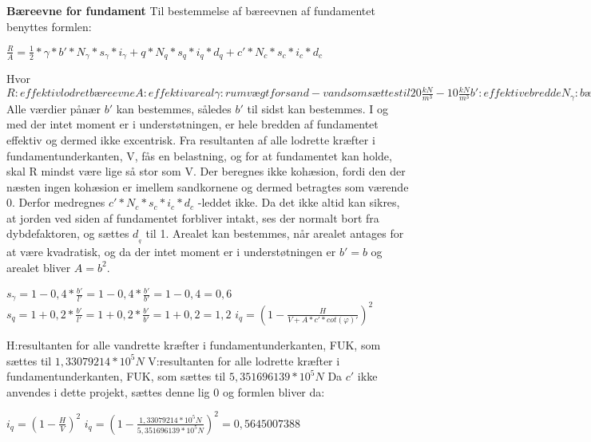 
\textbf{Bæreevne for fundament}
\newline
Til bestemmelse af bæreevnen af fundamentet benyttes formlen:
\begin{center}
	$\frac{R}{A}=\frac{1}{2}*\gamma*b'*N_\gamma*s_\gamma*i_\gamma+q*N_q*s_q*i_q*d_q+c'*N_c*s_c*i_c*d_c$
\end{center}

\newline
Hvor 
$R:effektiv lodret bæreevne
A:effektiv areal 
\gamma:rumvægt for sand - vand som sættes til 20\frac{kN}{m^3}-10\frac{kN}{m^3}
b':effektive bredde
N_\gamma:bæreevnefaktor 
s_\gamma og s_q:formfaktor
i_\gamma og i_q:hældningsfaktor
q:effektiv lodret overlejringstryk ved FUK 
d_q:dybdefaktor$
\newline
Alle værdier pånær $b'$ kan bestemmes, således $b'$ til sidst kan bestemmes.
I og med der intet moment er i understøtningen, er hele bredden af fundamentet effektiv og dermed ikke excentrisk. Fra resultanten af alle lodrette kræfter i fundamentunderkanten, V, fås en belastning, og for at fundamentet kan holde, skal R mindst være lige så stor som V.
Der beregnes ikke kohæsion, fordi den der næsten ingen kohæsion er imellem sandkornene og dermed betragtes som værende 0. Derfor medregnes $c'*N_c*s_c*i_c*d_c$ -leddet ikke.
Da det ikke altid kan sikres, at jorden ved siden af fundamentet forbliver intakt, ses der normalt bort fra dybdefaktoren, og sættes $d__q$ til 1.
Arealet kan bestemmes, når arealet antages for at være kvadratisk, og da der intet moment er i understøtningen er $b'=b$ og arealet bliver $A=b^2$.
\newline
\begin{center}
	$s_\gamma=1-0,\!4*\frac{b'}{l'}=1-0,\!4*\frac{b'}{b'}=1-0,\!4=0,\!6$
    $s_q=1+0,\!2*\frac{b'}{l'}=1+0,\!2*\frac{b'}{b'}=1+0,\!2=1,\!2$
    \newline
    $i_q=(1-\frac{H}{V+A*c'*cot(\varphi)'})^2$
\end{center}
\newline
H:resultanten for alle vandrette kræfter i fundamentunderkanten, FUK, som sættes til $1,\!33079214*10^5N$
V:resultanten for alle lodrette kræfter i fundamentunderkanten, FUK, som sættes til $5,\!351696139*10^5N$
\newline
Da $c'$ ikke anvendes i dette projekt, sættes denne lig 0 og formlen bliver da:
\begin{center}
	$i_q=(1-\frac{H}{V})^2$
	$i_q=(1-\frac{1,\!33079214*10^5N}{5,\!351696139*10^5N})^2=0,\!5645007388$
\end{center}
